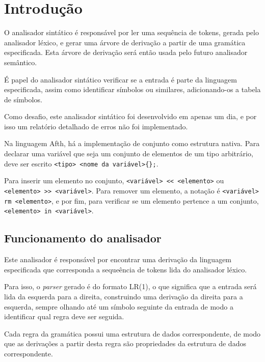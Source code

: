 \documentclass[
	article,			%
	11pt,				%
	oneside,			%
	a4paper,			%
	english,			%
	brazil,				%
	sumario=tradicional
	]{abntex2}
\begin{document}
\textual

\section{Introdução}

O analisador sintático é responsável por ler uma sequência de tokens, gerada pelo analisador léxico, e gerar uma árvore de derivação a partir de uma gramática especificada. Esta árvore de derivação será então usada pelo futuro analisador semântico.

É papel do analisador sintático verificar se a entrada é parte da linguagem especificada, assim como identificar símbolos ou similares, adicionando-os a tabela de símbolos.

Como desafio, este analisador sintático foi desenvolvido em apenas um dia, e por isso um relatório detalhado de erros não foi implementado. 

Na linguagem Afth, há a implementação de conjunto como estrutura nativa. Para declarar uma variável que seja um conjunto de elementos de um tipo arbitrário, deve ser escrito \texttt{<tipo> <nome da variável>\{\};}.

Para inserir um elemento no conjunto, \texttt{<variável> << <elemento>} ou \texttt{<elemento> >> <variável>}. Para remover um elemento, a notação é \texttt{<variável> rm <elemento>}, e por fim, para verificar se um elemento pertence a um conjunto, \texttt{<elemento> in <variável>}.

\subsection{Funcionamento do analisador}

Este analisador é responsável por encontrar uma derivação da linguagem especificada que corresponda a sequeência de tokens lida do analisador léxico.

Para isso, o \textit{parser} gerado é do formato LR(1), o que significa que a entrada será lida da esquerda para a direita, construindo uma derivação da direita para a esquerda, sempre olhando até um símbolo seguinte da entrada de modo a identificar qual regra deve ser seguida.

Cada regra da gramática possui uma estrutura de dados correspondente, de modo que as derivações a partir desta regra são propriedades da estrutura de dados correspondente.
\end{document}
